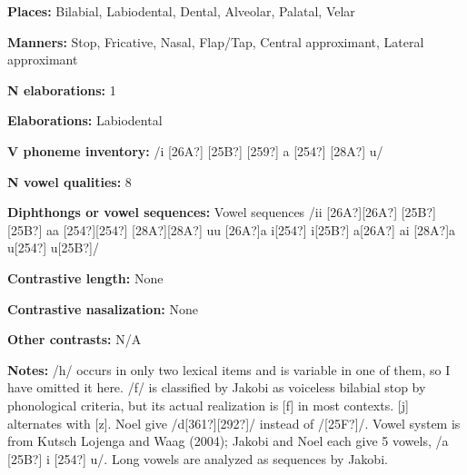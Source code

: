 \begin{styleBody}
\textbf{Places:} Bilabial, Labiodental, Dental, Alveolar, Palatal, Velar
\end{styleBody}

\begin{styleBody}
\textbf{Manners:} Stop, Fricative, Nasal, Flap/Tap, Central approximant, Lateral approximant
\end{styleBody}

\begin{styleBody}
\textbf{N elaborations:} 1
\end{styleBody}

\begin{styleBody}
\textbf{Elaborations:} Labiodental
\end{styleBody}

\begin{styleBody}
\textbf{V phoneme inventory:} /i [26A?] [25B?] [259?] a [254?] [28A?] u/
\end{styleBody}

\begin{styleBody}
\textbf{N vowel qualities:} 8
\end{styleBody}

\begin{styleBody}
\textbf{Diphthongs or vowel sequences:} Vowel sequences /ii [26A?][26A?] [25B?][25B?] aa [254?][254?] [28A?][28A?] uu [26A?]a i[254?] i[25B?] a[26A?] ai [28A?]a u[254?] u[25B?]/
\end{styleBody}

\begin{styleBody}
\textbf{Contrastive length:} None
\end{styleBody}

\begin{styleBody}
\textbf{Contrastive nasalization:} None
\end{styleBody}

\begin{styleBody}
\textbf{Other contrasts:} N/A
\end{styleBody}

\begin{styleBody}
\textbf{Notes:} /h/ occurs in only two lexical items and is variable in one of them, so I have omitted it here. /f/ is classified by Jakobi as voiceless bilabial stop by phonological criteria, but its actual realization is [f] in most contexts. [j] alternates with [z]. Noel give /d[361?][292?]/ instead of /[25F?]/. Vowel system is from Kutsch Lojenga and Waag (2004); Jakobi and Noel each give 5 vowels, /a [25B?] i [254?] u/. Long vowels are analyzed as sequences by Jakobi.
\end{styleBody}

